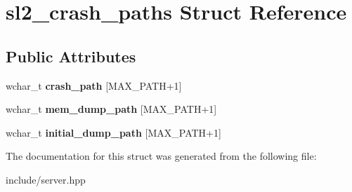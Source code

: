\hypertarget{structsl2__crash__paths}{}\section{sl2\+\_\+crash\+\_\+paths Struct Reference}
\label{structsl2__crash__paths}
\subsection*{Public Attributes}
\begin{DoxyCompactItemize}
\item 
\mbox{\label{structsl2__crash__paths_a9fca248c8abb395b4cfaed7717673ee7}} 
wchar\+\_\+t {\bfseries crash\+\_\+path} \mbox{[}M\+A\+X\+\_\+\+P\+A\+TH+1\mbox{]}
\item 
\mbox{\label{structsl2__crash__paths_a6fed07e5fa4aa74174fb67ae611ebcd8}} 
wchar\+\_\+t {\bfseries mem\+\_\+dump\+\_\+path} \mbox{[}M\+A\+X\+\_\+\+P\+A\+TH+1\mbox{]}
\item 
\mbox{\label{structsl2__crash__paths_a90dde76c23f7f35b8980198d7dffe471}} 
wchar\+\_\+t {\bfseries initial\+\_\+dump\+\_\+path} \mbox{[}M\+A\+X\+\_\+\+P\+A\+TH+1\mbox{]}
\end{DoxyCompactItemize}


The documentation for this struct was generated from the following file\+:\begin{DoxyCompactItemize}
\item 
include/server.\+hpp\end{DoxyCompactItemize}
